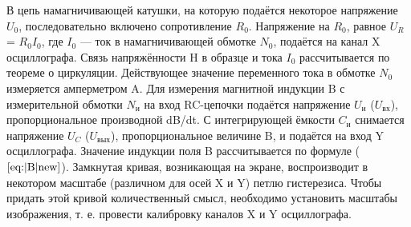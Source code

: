 \documentclass[a4paper, 12pt]{article}
\begin{document}
В цепь намагничивающей катушки, на которую подаётся некоторое
напряжение $U_0$, последовательно включено сопротивление $R_0$. Напряжение на $R_0$, равное $U_R$= $R_0I_0$, где $I_0$ — ток в намагничивающей обмотке $N_0$, подаётся на канал X осциллографа. Связь напряжённости H в
образце и тока $I_0$ рассчитывается по теореме о циркуляции. 
Действующее значение переменного тока в обмотке $N_0$ измеряется амперметром A.
Для измерения магнитной индукции B с измерительной обмотки $N_и$
на вход RC-цепочки подаётся напряжение $U_и$ ($U_{вх}$), пропорциональное
производной dB/dt. С интегрирующей ёмкости $C_и$ снимается напряжение $U_C$ ($U_{вых}$), пропорциональное величине B, и подаётся на вход Y
осциллографа. Значение индукции поля B рассчитывается по формуле ($\ref{eq:|B|new}$).
Замкнутая кривая, возникающая на экране, воспроизводит в некотором масштабе (различном для осей X и Y) петлю гистерезиса. Чтобы придать этой кривой количественный смысл, необходимо установить
масштабы изображения, т. е. провести калибровку каналов X и Y осциллографа.
\end{document}
